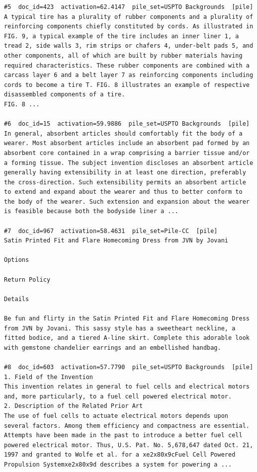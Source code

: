 \begin{verbatim}
#5  doc_id=423  activation=62.4147  pile_set=USPTO Backgrounds  [pile]
A typical tire has a plurality of rubber components and a plurality of reinforcing components chiefly constituted by cords. As illustrated in FIG. 9, a typical example of the tire includes an inner liner 1, a tread 2, side walls 3, rim strips or chafers 4, under-belt pads 5, and other components, all of which are built by rubber materials having required characteristics. These rubber components are combined with a carcass layer 6 and a belt layer 7 as reinforcing components including cords to become a tire T. FIG. 8 illustrates an example of respective disassembled components of a tire.
FIG. 8 ...

#6  doc_id=15  activation=59.9886  pile_set=USPTO Backgrounds  [pile]
In general, absorbent articles should comfortably fit the body of a wearer. Most absorbent articles include an absorbent pad formed by an absorbent core contained in a wrap comprising a barrier tissue and/or a forming tissue. The subject invention discloses an absorbent article generally having extensibility in at least one direction, preferably the cross-direction. Such extensibility permits an absorbent article to extend and expand about the wearer and thus to better conform to the body of the wearer. Such extension and expansion about the wearer is feasible because both the bodyside liner a ...

#7  doc_id=967  activation=58.4631  pile_set=Pile-CC  [pile]
Satin Printed Fit and Flare Homecoming Dress from JVN by Jovani

Options

Return Policy

Details

Be fun and flirty in the Satin Printed Fit and Flare Homecoming Dress from JVN by Jovani. This sassy style has a sweetheart neckline, a fitted bodice, and a tiered A-line skirt. Complete this adorable look with gemstone chandelier earrings and an embellished handbag.

#8  doc_id=603  activation=57.7790  pile_set=USPTO Backgrounds  [pile]
1. Field of the Invention
This invention relates in general to fuel cells and electrical motors and, more particularly, to a fuel cell powered electrical motor.
2. Description of the Related Prior Art
The use of fuel cells to actuate electrical motors depends upon several factors. Among them efficiency and compactness are essential.
Attempts have been made in the past to introduce a better fuel cell powered electrical motor. Thus, U.S. Pat. No. 5,678,647 dated Oct. 21, 1997 and granted to Wolfe et al. for a xe2x80x9cFuel Cell Powered Propulsion Systemxe2x80x9d describes a system for powering a ...


\end{verbatim}
